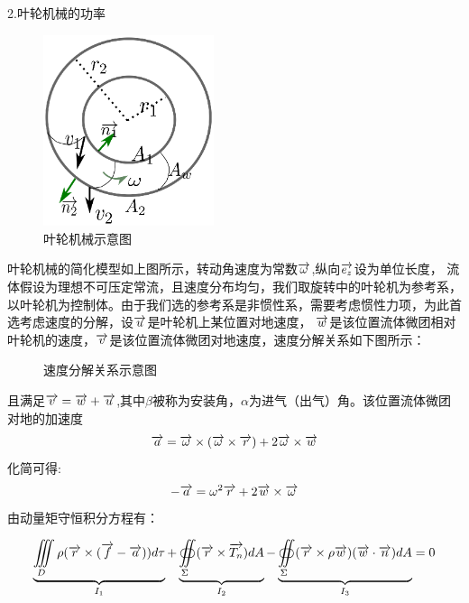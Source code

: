 2.叶轮机械的功率
\begin{figure}[!ht]
\centering
\includegraphics[width=5cm]{turbine_power.eps}
\caption{叶轮机械示意图}\label{fig:512}
\end{figure}

叶轮机械的简化模型如上图所示，转动角速度为常数$\overrightarrow{\omega}$,纵向$\overrightarrow{e_z}$设为单位长度，
流体假设为理想不可压定常流，且速度分布均匀，我们取旋转中的叶轮机为参考系，
以叶轮机为控制体。由于我们选的参考系是非惯性系，需要考虑惯性力项，为此首选考虑速度的分解，设$\overrightarrow{u}$是叶轮机上某位置对地速度，
$\overrightarrow{w}$是该位置流体微团相对叶轮机的速度，$\overrightarrow{v}$是该位置流体微团对地速度，速度分解关系如下图所示：
\begin{figure}[!ht]
\centering

\caption{速度分解关系示意图}\label{fig:513}
\end{figure}
且满足$\overrightarrow{v}=\overrightarrow{w}+\overrightarrow{u}$,其中$\beta$被称为安装角，$\alpha$为进气（出气）角。该位置流体微团对地的加速度
\begin{equation}
\overrightarrow{a}=\overrightarrow{\omega}\times(\overrightarrow{\omega}\times \overrightarrow{r})+2\overrightarrow{\omega}\times \overrightarrow{w}
\end{equation}
化简可得:
\begin{equation}\label{eq:51acc}
-\overrightarrow{a}=\omega^2 \overrightarrow{r} +2\overrightarrow{w}\times \overrightarrow{\omega}
\end{equation}
由动量矩守恒积分方程有：

\begin{equation}\label{eq:momentumConservation}
\underbrace{\iiint\limits_D \rho(\overrightarrow{r}\times (\overrightarrow{f}-\overrightarrow{a}))d\tau}_{I_1}+
\underbrace{\oiint\limits_{\Sigma} (\overrightarrow{r}\times\overrightarrow{T_n})dA}_{I_2}-
\underbrace{\oiint\limits_{\Sigma} (\overrightarrow{r}\times \rho\overrightarrow{w})(\overrightarrow{w}\cdot\overrightarrow{n})dA}_{I_3}=0
\end{equation}

